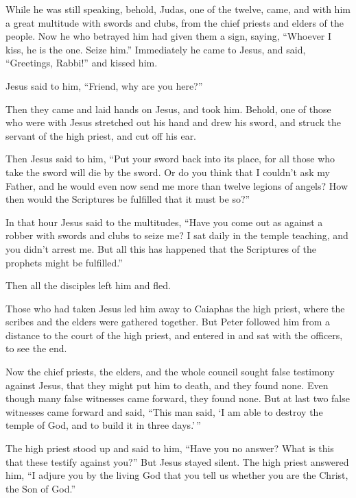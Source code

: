  While he was still speaking, behold, Judas, one of the
twelve, came, and with him a great multitude with swords and clubs, from
the chief priests and elders of the people.  Now he who
betrayed him had given them a sign, saying, ``Whoever I kiss, he is the
one. Seize him.''  Immediately he came to Jesus, and
said, ``Greetings, Rabbi!'' and kissed him.

 Jesus said to him, ``Friend, why are you here?''

Then they came and laid hands on Jesus, and took him. 
Behold, one of those who were with Jesus stretched out his hand and drew
his sword, and struck the servant of the high priest, and cut off his
ear.

 Then Jesus said to him, ``Put your sword back into its
place, for all those who take the sword will die by the sword.
 Or do you think that I couldn't ask my Father, and he
would even now send me more than twelve legions of angels?
 How then would the Scriptures be fulfilled that it must
be so?''

 In that hour Jesus said to the multitudes, ``Have you
come out as against a robber with swords and clubs to seize me? I sat
daily in the temple teaching, and you didn't arrest me. 
But all this has happened that the Scriptures of the prophets might be
fulfilled.''

Then all the disciples left him and fled.

 Those who had taken Jesus led him away to Caiaphas the
high priest, where the scribes and the elders were gathered together.
 But Peter followed him from a distance to the court of
the high priest, and entered in and sat with the officers, to see the
end.

 Now the chief priests, the elders, and the whole council
sought false testimony against Jesus, that they might put him to death,
 and they found none. Even though many false witnesses
came forward, they found none. But at last two false witnesses came
forward  and said, ``This man said, `I am able to destroy
the temple of God, and to build it in three days.'\,''

 The high priest stood up and said to him, ``Have you no
answer? What is this that these testify against you?'' 
But Jesus stayed silent. The high priest answered him, ``I adjure you by
the living God that you tell us whether you are the Christ, the Son of
God.''

